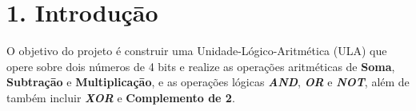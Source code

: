 \section*{1. Introduçāo}

O objetivo do projeto é construir uma Unidade-Lógico-Aritmética (ULA) que opere sobre dois números de 4 bits e realize as operações aritméticas de \textbf{Soma}, \textbf{Subtraçāo} e \textbf{Multiplicaçāo}, e as operações lógicas \textbf{\textit{AND}}, \textbf{\textit{OR}} e \textbf{\textit{NOT}}, além de também incluir \textbf{\textit{XOR}} e \textbf{Complemento de 2}.